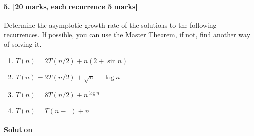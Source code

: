 \documentclass[a4paper]{scrartcl}
\begin{document}
\paragraph{5. [20 marks, each recurrence 5 marks]}
\label{sec:Question 5}
Determine the asymptotic growth rate of the solutions to the following recurrences. If possible, you can use the Master Theorem, if not, find another way of solving it.
\begin{enumerate}[label=(\alph*)]
  \item $T (n) = 2T (n/2) + n(2 + \sin{n})$
  \item $T (n) = 2T (n/2) + \sqrt{n} + \log{n}$
  \item $T (n) = 8T (n/2) + n^{\log{n}}$
  \item $T (n) = T (n − 1) + n$
\end{enumerate}
\paragraph{Solution}
\end{document}
